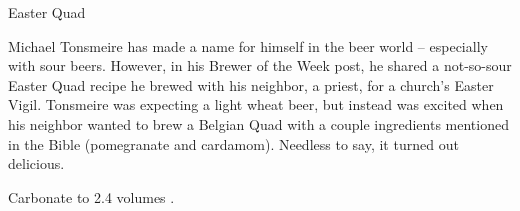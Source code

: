 \stylesection{\stylebelgiandarkstrongale}

\begin{recipie}{Easter Quad}

\begin{aboutblock}
Michael Tonsmeire has made a name for himself in the beer world -- especially
with sour beers. However, in his Brewer of the Week post, he shared a not-so-sour
Easter Quad recipe he brewed with his neighbor, a priest, for a church's Easter Vigil.
Tonsmeire was expecting a light wheat beer, but instead was excited when his neighbor
wanted to brew a Belgian Quad with a couple ingredients mentioned in the Bible
(pomegranate and cardamom). Needless to say, it turned out delicious.
\end{aboutblock}


\begin{methodandtiming}
 
\begin{mashsteps}
\end{mashsteps}

\begin{fermentationsteps}
\end{fermentationsteps}

\begin{directions}
Carbonate to 2.4 volumes .
\end{directions}

\end{methodandtiming}

\pagebreak

\begin{ingredientsblock}

\begin{malts}
\end{malts}

\begin{hops}
\end{hops}

\begin{yeasts}
\end{yeasts}

\begin{twists}
\end{twists}

\end{ingredientsblock}

\end{recipie}